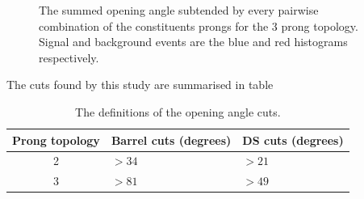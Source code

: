 \begin{figure}%
  \centering
  \caption{The summed opening angle subtended by every pairwise combination of the constituents prongs for the 3 prong topology.  Signal and background events are the blue and red histograms respectively.}
  \label{fig:Sel3OpeningAngle}
\end{figure}
The cuts found by this study are summarised in table
\begin{table}
  \begin{tabular}{ c l l }
    Prong topology & Barrel cuts (degrees) & DS cuts (degrees) \\ \hline \hline
    2 & $>34$ & $>21$ \\
    3 & $>81$ & $>49$ \\
  \end{tabular}
  \caption{The definitions of the opening angle cuts.}
  \label{table:SelOpeningAngle}
\end{table}
